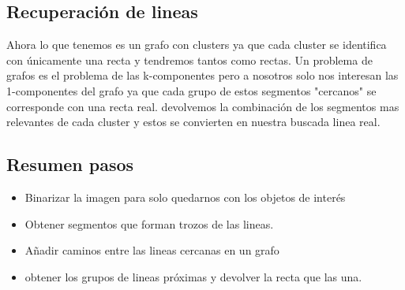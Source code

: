\subsection{Recuperación de lineas}
Ahora lo que tenemos es un grafo con clusters ya que cada cluster se identifica con únicamente una recta y tendremos tantos como rectas.
Un problema de grafos es el problema de las k-componentes pero a nosotros solo nos interesan las 1-componentes del grafo ya que cada grupo de estos segmentos "cercanos" se corresponde con una recta real.
devolvemos la combinación de los segmentos mas relevantes de cada cluster y estos se convierten en nuestra buscada linea real.

\subsection{Resumen pasos}

\begin{itemize}
\item Binarizar la imagen para solo quedarnos con los objetos de interés
\item Obtener segmentos que forman trozos de las lineas.
\item Añadir caminos entre las lineas cercanas en un grafo
\item obtener los grupos de lineas próximas y devolver la recta que las una. 
\end{itemize}


